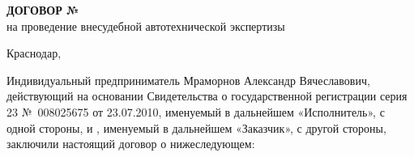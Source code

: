 \documentclass[a4paper,12pt,english,notitlepage]{report}
\begin{document}
	\def\цена{70000}
	
	\pagestyle{plain}
	
	
	
	\pagestyle{fancy}
	\frenchspacing 
	\fancyhf{}
	\fancyhead{}
	\fancyfoot{} 
	\fancyhead[RE]{ } %
	\fancyhead{}
	\fancyhead[RE]{\small \NomerDoc} %
	
	\fancyfoot[R]{\textcolor{black}{ \textit{{\small }} \rule{3cm}{0.1 mm}}}
	
	\fancyfoot[CE]{\thepage}%
	\fancyfoot[CO]{\thepage}
	
	
	\renewcommand{\headrulewidth}{0 mm}%
	\renewcommand{\headrule}{\hbox to\headwidth{%
			\color{red}\leaders\hrule height \headrulewidth\hfill}}
	
	\renewcommand{\footrulewidth}{0 mm}%
	\futurelet\TMPfootrule\def\footrule{{\color{black}\TMPfootrule}}
	\thispagestyle{empty}  %
	
	

\begin{center}
    	\textbf{{\large  ДОГОВОР № \NomerDoc}}\\
    	 на проведение внесудебной автотехнической экспертизы 
    	 \vspace{-3mm}
    \end{center}
\vspace{-3mm}
\begin{flushright}
		\hfill	Краснодар, \dog    \\[8mm]
\end{flushright} 
\vspace{-6mm}
Индивидуальный предприниматель Мраморнов Александр Вячеславович, действующий на основании Свидетельства о государственной регистрации серия 23 №~008025675 от 23.07.2010, именуемый в дальнейшем «Исполнитель», с одной стороны, и ,  именуемый в дальнейшем «Заказчик», с другой стороны, заключили настоящий договор о нижеследующем:
\end{document}
